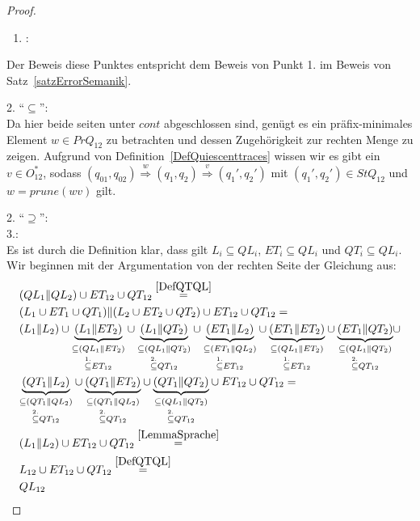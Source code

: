 \begin{proof}
  ~
  \begin{enumerate}
    \item \hspace{-0.2cm}:
  \end{enumerate}
  \vspace{-0.4cm}
  Der Beweis diese Punktes entspricht dem Beweis von Punkt 1. im Beweis von
  Satz~\ref{satzErrorSemanik}.

  2. ``$\subseteq$'':\\
  Da hier beide seiten unter $cont$ abgeschlossen sind, genügt es ein
  präfix-minimales Element $w\in PrQ_{12}$ zu betrachten und dessen
  Zugehörigkeit zur rechten Menge zu zeigen. Aufgrund von
  Definition~\ref{DefQuiescenttraces} wissen wir es gibt ein $v\in O_{12}^*$,
  sodass $(q_{01},q_{02}) \overset{w}{\Rightarrow} (q_1,q_2)
  \overset{v}{\Rightarrow} (q_1',q_2')$ mit $(q_1',q_2')\in StQ_{12}$ und
  $w=prune(wv)$ gilt.

  2. ``$\supseteq$'':\\%

  3.:\\
  Es ist durch die Definition klar, dass gilt $L_i\subseteq QL_i$,
  $ET_i\subseteq QL_i$ und $QT_i\subseteq QL_i$. Wir beginnen mit der
  Argumentation von der rechten Seite der Gleichung aus:
  \begin{align*}
    &(QL_1\| QL_2)\cup ET_{12}\cup QT_{12}\overset{\ref{DefQTQL}}{=}\\
    &(L_1\cup ET_1\cup QT_1)\|(L_2\cup ET_2\cup QT_2)\cup ET_{12}\cup QT_{12}=\\
    &(L_1\|L_2)\cup
    \underset{\overset{1.}{\subseteq} ET_{12}}{\underset{\subseteq
    (QL_1\|ET_2)}{\underbrace{(L_1\|ET_2)}}} \cup
    \underset{\overset{2.}{\subseteq} QT_{12}}{\underset{\subseteq
    (QL_1\|QT_2)}{\underbrace{(L_1\|QT_2)}}} \cup
    \underset{\overset{1.}{\subseteq} ET_{12}}{\underset{\subseteq
    (ET_1\|QL_2)}{\underbrace{(ET_1\|L_2)}}} \cup
    \underset{\overset{1.}{\subseteq} ET_{12}}{\underset{\subseteq
    (QL_1\|ET_2)}{\underbrace{(ET_1\|ET_2)}}} \cup
    \underset{\overset{2.}{\subseteq} QT_{12}}{\underset{\subseteq
    (QL_1\|QT_2)}{\underbrace{(ET_1\|QT_2)}}} \cup\\
    &\underset{\overset{2.}{\subseteq} QT_{12}}{\underset{\subseteq
    (QT_1\|QL_2)}{\underbrace{(QT_1\|L_2)}}} \cup
    \underset{\overset{2.}{\subseteq} QT_{12}}{\underset{\subseteq
    (QT_1\|QL_2)}{\underbrace{(QT_1\|ET_2)}}} \cup
    \underset{\overset{2.}{\subseteq} QT_{12}}{\underset{\subseteq
    (QL_1\|QT_2)}{\underbrace{(QT_1\|QT_2)}}} \cup
    ET_{12} \cup QT_{12}=\\
    &(L_1\|L_2) \cup ET_{12} \cup QT_{12}\overset{\ref{LemmaSprache}}{=}\\
    &L_{12}\cup ET_{12}\cup QT_{12}\overset{\ref{DefQTQL}}{=}\\
    &QL_{12}
  \end{align*}
\end{proof}
